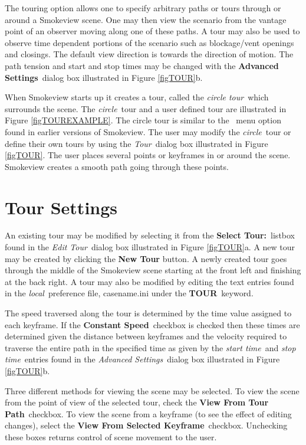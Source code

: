 \documentclass[11pt,twoside]{book}
\newcommand{\tourmenu}{\fbox{\tt Tour} }
\begin{document}
The touring option allows one to specify arbitrary paths or tours
through or around a Smokeview scene.  One may then view the
scenario from the vantage point of an observer moving along one of
these paths.    A tour
may also be used to observe time dependent portions of the
scenario such as blockage/vent openings and closings.  The default
view direction is towards the direction of motion.  The path tension and start and stop times may be changed with the {\bf Advanced
Settings}\ dialog box illustrated in Figure \ref{figTOUR}b.

When Smokeview starts up it creates a tour, called the {\em circle
tour}\ which surrounds the scene.  The {\em circle}\ tour and a user
defined tour are illustrated in Figure \ref{figTOUREXAMPLE}. The
circle tour is similar to the \tourmenu\ menu option found in
earlier versions of Smokeview. The user may modify the {\em circle}\
tour or define their own tours by using the {\em Tour}\ dialog box
illustrated in Figure \ref{figTOUR}. The user places several
points or keyframes in or around the scene. Smokeview creates a
smooth path going through these points.

\section{Tour Settings}
An existing tour may be modified by selecting it from the {\bf
Select Tour:}\ listbox found in the {\em Edit Tour}\ dialog box illustrated in Figure \ref{figTOUR}a.  A new tour
may be created by clicking the {\bf New Tour} button. A newly
created tour goes through the middle of the Smokeview scene
starting at the front left and finishing at the back right. A tour
may also be modified by editing the text entries found in the
{\em local}\ preference file, casename.ini under the {\bf TOUR}\
keyword.

The speed traversed along the tour is determined by the time value
assigned to each keyframe.   If the {\bf Constant Speed}\ checkbox
is checked then these times are determined given the distance
between keyframes and the velocity required to traverse the entire
path in the specified time as given by the {\em start time}\ and
{\em stop time}\ entries found in the {\em Advanced Settings}\ dialog
box illustrated in Figure \ref{figTOUR}b.


Three different methods for viewing the scene may be selected.  To
view the scene from the point of view of the selected tour, check
the {\bf View From Tour Path}\ checkbox. To view the scene from a
keyframe (to see the effect of editing changes), select the {\bf
View From Selected Keyframe}\ checkbox. Unchecking these boxes
returns control of scene movement to the user.
\end{document}
